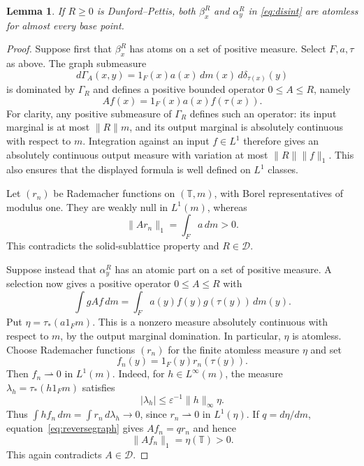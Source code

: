 \documentclass[11pt,reqno]{amsart}
\newtheorem{lemma}[theorem]{Lemma}
\theoremstyle{definition}
\theoremstyle{remark}
\newcommand{\T}{\mathbb T}
\newcommand{\D}{\mathcal D}
\begin{document}
\begin{lemma}\label{lem:atomless}
If $R\geq0$ is Dunford--Pettis, both $\beta_x^R$ and $\alpha_y^R$ in \eqref{eq:disint} are atomless for almost every base point.
\end{lemma}
\begin{proof}
Suppose first that $\beta_x^R$ has atoms on a set of positive measure. Select $F,a,\tau$ as above. The graph submeasure
\[
 d\Gamma_A(x,y)=1_F(x)a(x)\,dm(x)\,d\delta_{\tau(x)}(y)
\]
is dominated by $\Gamma_R$ and defines a positive bounded operator $0\leq A\leq R$, namely
\[
 Af(x)=1_F(x)a(x)f(\tau(x)).
\]
For clarity, any positive submeasure of $\Gamma_R$ defines such an operator: its input marginal is at most $\|R\|m$, and its output marginal is absolutely continuous with respect to $m$. Integration against an input $f\in L^1$ therefore gives an absolutely continuous output measure with variation at most $\|R\|\|f\|_1$. This also ensures that the displayed formula is well defined on $L^1$ classes.

Let $(r_n)$ be Rademacher functions on $(\T,m)$, with Borel representatives of modulus one. They are weakly null in $L^1(m)$, whereas
\[
 \|Ar_n\|_1=\int_F a\,dm>0.
\]
This contradicts the solid-sublattice property and $R\in\D$.

Suppose instead that $\alpha_y^R$ has an atomic part on a set of positive measure. A selection now gives a positive operator $0\leq A\leq R$ with
\begin{equation}\label{eq:reversegraph}
 \int gAf\,dm=\int_F a(y)f(y)g(\tau(y))\,dm(y).
\end{equation}
Put $\eta=\tau_*(a1_Fm)$. This is a nonzero measure absolutely continuous with respect to $m$, by the output marginal domination. In particular, $\eta$ is atomless. Choose Rademacher functions $(r_n)$ for the finite atomless measure $\eta$ and set
\[
 f_n(y)=1_F(y)r_n(\tau(y)).
\]
Then $f_n\rightharpoonup0$ in $L^1(m)$. Indeed, for $h\in L^\infty(m)$, the measure $\lambda_h=\tau_*(h1_Fm)$ satisfies
\[
 |\lambda_h|\leq\varepsilon^{-1}\|h\|_\infty\eta.
\]
Thus $\int hf_n\,dm=\int r_n\,d\lambda_h\to0$, since $r_n\rightharpoonup0$ in $L^1(\eta)$. If $q=d\eta/dm$, equation~\eqref{eq:reversegraph} gives $Af_n=qr_n$ and hence
\[
 \|Af_n\|_1=\eta(\T)>0.
\]
This again contradicts $A\in\D$.
\end{proof}
\end{document}
